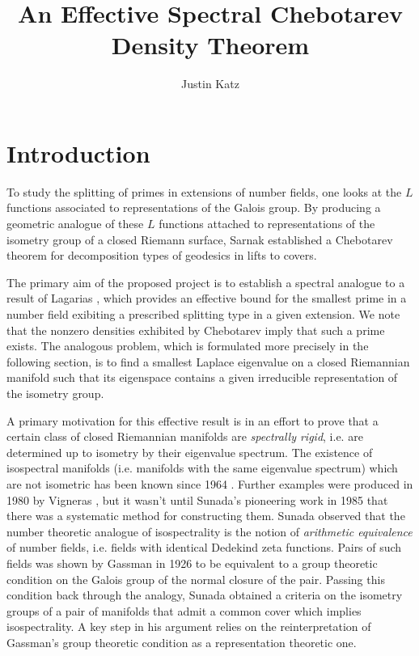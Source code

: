 \documentclass[11pt]{article}
\title{An Effective Spectral Chebotarev Density Theorem }
\author{Justin Katz}
\begin{document}
\maketitle
\section{Introduction}






To study the splitting of primes in extensions of number fields, one looks at the $L$ functions associated to representations of the Galois group. By producing a geometric analogue of these $L$ functions attached to representations of the isometry group of a closed Riemann surface, Sarnak \cite{sarnak1982} established a Chebotarev theorem for decomposition types of geodesics in lifts to covers. 


 
The primary aim of the proposed project is to establish a spectral analogue to a result of Lagarias \cite{lagarias1979}, which provides an effective bound for the smallest prime in a number field exibiting a prescribed splitting type in a given extension. We note that the nonzero densities exhibited by Chebotarev imply that such a prime exists. The analogous problem, which is formulated more precisely in the following section, is to find a smallest Laplace eigenvalue on a closed Riemannian manifold such that its eigenspace contains a given irreducible representation of the isometry group. 

A primary motivation for this effective result is in an effort to prove that a certain class of closed Riemannian manifolds are \emph{spectrally rigid}, i.e. are determined up to isometry by their eigenvalue spectrum. The existence of isospectral manifolds (i.e. manifolds with the same eigenvalue spectrum) which are not isometric has been known since 1964 \cite{milnor1964}. Further examples were produced in 1980 by Vigneras \cite{vigneras1980}, but it wasn't until Sunada's pioneering work in 1985 \cite{Sunada1985} that there was a systematic method for constructing them. Sunada observed that the number theoretic analogue of isospectrality is the notion of \emph{arithmetic equivalence} of number fields, i.e. fields with identical Dedekind zeta functions. Pairs of such fields was shown by Gassman \cite{gassmann1926} in 1926 to be  equivalent to a group theoretic condition on the Galois group of the normal closure of the pair. Passing this condition back through the analogy, Sunada obtained a criteria on the isometry groups of a pair of manifolds that admit a common cover which implies isospectrality. A key step in his argument relies on the reinterpretation of Gassman's group theoretic condition as a representation theoretic one.  
\end{document}
